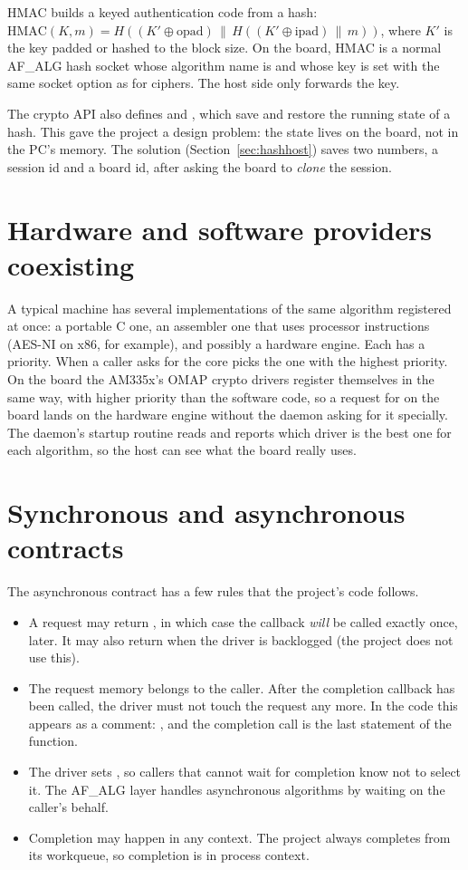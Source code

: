 HMAC builds a keyed authentication code from a hash: $\text{HMAC}(K,m) = H((K' \oplus \text{opad}) \,\|\, H((K' \oplus \text{ipad}) \,\|\, m))$, where $K'$ is the key padded or hashed to the block size. On the board, HMAC is a normal AF\_ALG hash socket whose algorithm name is  and whose key is set with the same socket option as for ciphers. The host side only forwards the key.

The crypto API also defines  and , which save and restore the running state of a hash. This gave the project a design problem: the state lives on the board, not in the PC's memory. The solution (Section~\ref{sec:hashhost}) saves two numbers, a session id and a board id, after asking the board to \emph{clone} the session.

\section{Hardware and software providers coexisting}

A typical machine has several implementations of the same algorithm registered at once: a portable C one, an assembler one that uses processor instructions (AES-NI on x86, for example), and possibly a hardware engine. Each has a priority. When a caller asks for  the core picks the one with the highest priority. On the board the AM335x's OMAP crypto drivers register themselves in the same way, with higher priority than the software code, so a request for  on the board lands on the hardware engine without the daemon asking for it specially. The daemon's startup routine reads  and reports which driver is the best one for each algorithm, so the host can see what the board really uses.

\section{Synchronous and asynchronous contracts}

The asynchronous contract has a few rules that the project's code follows.

\begin{itemize}
  \item A request may return , in which case the callback \emph{will} be called exactly once, later. It may also return  when the driver is backlogged (the project does not use this).
  \item The request memory belongs to the caller. After the completion callback has been called, the driver must not touch the request any more. In the code this appears as a comment: , and the completion call is the last statement of the function.
  \item The driver sets , so callers that cannot wait for completion know not to select it. The AF\_ALG layer handles asynchronous algorithms by waiting on the caller's behalf.
  \item Completion may happen in any context. The project always completes from its workqueue, so completion is in process context.
\end{itemize}

